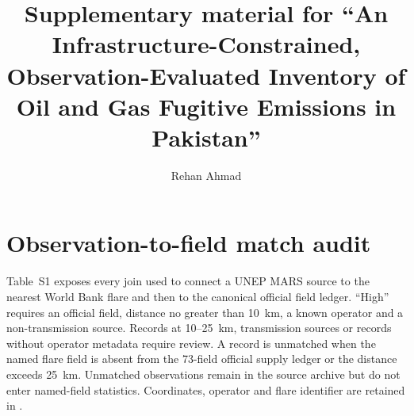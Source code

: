 \documentclass[3p,times,authoryear]{elsarticle}
\begin{document}
\begin{frontmatter}
\title{Supplementary material for ``An Infrastructure-Constrained,
Observation-Evaluated Inventory of Oil and Gas Fugitive Emissions in Pakistan''}
\author[paqi]{Rehan Ahmad}
\address[paqi]{Pakistan Air Quality Initiative (PAQI), Karachi, Pakistan}
\end{frontmatter}

\ReleaseCover

\renewcommand{\thetable}{S\arabic{table}}

\section{Observation-to-field match audit}

Table~S1 exposes every join used to connect a UNEP MARS source to the nearest World Bank flare
and then to the canonical official field ledger. ``High'' requires an official field, distance
no greater than 10~km, a known operator and a non-transmission source. Records at 10--25~km,
transmission sources or records without operator metadata require review. A record is unmatched
when the named flare field is absent from the 73-field official supply ledger or the distance
exceeds 25~km. Unmatched observations remain in the source archive but do not enter named-field
statistics. Coordinates, operator and flare identifier are retained in
.
\end{document}
